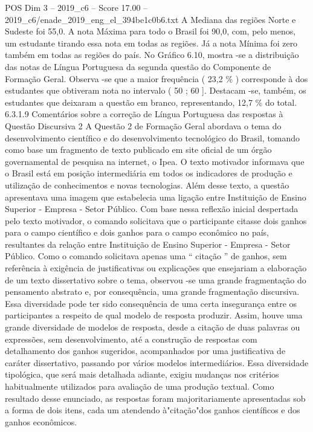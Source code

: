 \begin{textsample}{POS Dim 3 – 2019\_c6 – Score 17.00 – 2019\_c6/enade\_2019\_eng\_el\_394be1c0b6.txt}
A Mediana das regiões Norte e Sudeste foi 55,0.
A nota Máxima para todo o Brasil foi 90,0, com, pelo menos, um estudante tirando essa nota em todas as regiões.
Já a nota Mínima foi zero também em todas as regiões do país.
No Gráfico 6.10, mostra -se a distribuição das notas de Língua Portuguesa da segunda questão do Componente de Formação Geral.
Observa -se que a maior frequência ( 23,2 \% ) corresponde à dos estudantes que obtiveram nota no intervalo ( 50 ; 60 ].
Destacam -se, também, os estudantes que deixaram a questão em branco, representando, 12,7 \% do total. 6.3.1.9 Comentários sobre a correção de Língua Portuguesa das respostas à Questão Discursiva 2 A Questão 2 de Formação Geral abordava o tema do desenvolvimento científico e do desenvolvimento tecnológico do Brasil, tomando como base um fragmento de texto publicado em site oficial de um órgão governamental de pesquisa na internet, o Ipea.
O texto motivador informava que o Brasil está em posição intermediária em todos os indicadores de produção e utilização de conhecimentos e novas tecnologias.
Além desse texto, a questão apresentava uma imagem que estabelecia uma ligação entre Instituição de Ensino Superior - Empresa - Setor Público.
Com base nessa reflexão inicial despertada pelo texto motivador, o comando solicitava que o participante citasse dois ganhos para o campo científico e dois ganhos para o campo econômico no país, resultantes da relação entre Instituição de Ensino Superior - Empresa - Setor Público.
Como o comando solicitava apenas uma “ citação ” de ganhos, sem referência à exigência de justificativas ou explicações que ensejariam a elaboração de um texto dissertativo sobre o tema, observou -se uma grande fragmentação do pensamento abstrato e, por consequência, uma grande fragmentação discursiva.
Essa diversidade pode ter sido consequência de uma certa insegurança entre os participantes a respeito de qual modelo de resposta produzir.
Assim, houve uma grande diversidade de modelos de resposta, desde a citação de duas palavras ou expressões, sem desenvolvimento, até a construção de respostas com detalhamento dos ganhos sugeridos, acompanhados por uma justificativa de caráter dissertativo, passando por vários modelos intermediários.
Essa diversidade tipológica, que será mais detalhada adiante, exigiu mudanças nos critérios habitualmente utilizados para avaliação de uma produção textual.
Como resultado desse enunciado, as respostas foram majoritariamente apresentadas sob a forma de dois itens, cada um atendendo à"citação"dos ganhos científicos e dos ganhos econômicos.

\end{textsample}
